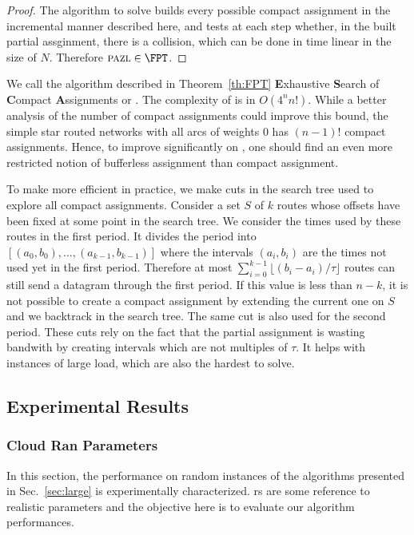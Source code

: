 \begin{proof}
The algorithm to solve \pma builds every possible compact assignment in the incremental manner described here, and tests at each step whether, in the built partial assginment, there is a collision, which can be done in time linear in the size of $N$. Therefore $\pma \in \FPT$.
\end{proof}


We call the algorithm described in Theorem~\ref{th:FPT} \textbf{E}xhaustive \textbf{S}earch of \textbf{C}ompact \textbf{A}ssignments or \ESCA. The complexity of \ESCA is in $O(4^n n!)$. While a better analysis of the number of compact assignments could improve this bound, the simple star routed networks with all arcs of weights $0$ has $(n-1)!$ compact assignments. Hence, to improve significantly on \ESCA, one should find an even more restricted notion of bufferless assignment than compact assignment.

To make \ESCA more efficient in practice, we make cuts in the search tree used to explore all compact assignments. Consider a set $S$ of $k$ routes whose offsets have been fixed at some point in the search tree. We consider the times used by these routes in the first period. It divides the period into $[(a_0,b_0), \dots, (a_{k-1},b_{k-1})]$ where the intervals $(a_i,b_i)$ are the times not used yet in the first period. Therefore at most $\displaystyle{ \sum_{i=0}^{k-1} \lfloor(b_{i} -a_i)/\tau\rfloor}$ routes can still send a datagram through the first period. If this value is less than $n - k$, it is not possible to create a compact assignment by extending the current one on $S$ and we backtrack in the search tree. The same cut is also used for the second period. These cuts rely on the fact that the partial assignment is wasting bandwith by creating intervals which are not multiples of $\tau$. It helps with instances of large load, which are also the hardest to solve.


\subsection{Experimental Results} \label{sec:perf_large}

\subsubsection{Cloud Ran Parameters}\label{sec:pazlcran}
In this section, the performance on random instances of the algorithms presented in Sec.~\ref{sec:large} is experimentally characterized.
rs are some reference to realistic parameters and the objective here is to evaluate our algorithm performances.

